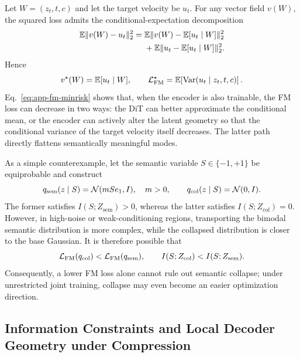 Let $W=(z_t,t,c)$ and let the target velocity be $u_t$. For any vector field $v(W)$, the squared loss admits the conditional-expectation decomposition
\begin{equation}
\begin{aligned}
    \mathbb{E}\|v(W)-u_t\|_2^2
    ={}&
    \mathbb{E}\|v(W)-\mathbb{E}[u_t\mid W]\|_2^2\\
    &+
    \mathbb{E}\|u_t-\mathbb{E}[u_t\mid W]\|_2^2.
\end{aligned}
\label{eq:app-fm-biasvariance}
\end{equation}
Hence
\begin{equation}
    v^\star(W)=\mathbb{E}[u_t\mid W],
    \qquad
    \mathcal{L}_{\mathrm{FM}}^\star
    =
    \mathbb{E}\!\left[\operatorname{Var}(u_t\mid z_t,t,c)\right].
    \label{eq:app-fm-minrisk}
\end{equation}
Eq.~\eqref{eq:app-fm-minrisk} shows that, when the encoder is also trainable, the FM loss can decrease in two ways: the DiT can better approximate the conditional mean, or the encoder can actively alter the latent geometry so that the conditional variance of the target velocity itself decreases. The latter path directly flattens semantically meaningful modes.

As a simple counterexample, let the semantic variable $S\in\{-1,+1\}$ be equiprobable and construct
\begin{equation}
    q_{\mathrm{sem}}(z\mid S)=\mathcal{N}(mSe_1,I),\quad m>0,
    \qquad
    q_{\mathrm{col}}(z\mid S)=\mathcal{N}(0,I).
    \label{eq:app-collapse-example}
\end{equation}
The former satisfies $I(S;Z_{\mathrm{sem}})>0$, whereas the latter satisfies $I(S;Z_{\mathrm{col}})=0$. However, in high-noise or weak-conditioning regions, transporting the bimodal semantic distribution is more complex, while the collapsed distribution is closer to the base Gaussian. It is therefore possible that
\begin{equation}
    \mathcal{L}_{\mathrm{FM}}(q_{\mathrm{col}})
    <
    \mathcal{L}_{\mathrm{FM}}(q_{\mathrm{sem}}),
    \qquad
    I(S;Z_{\mathrm{col}})
    <
    I(S;Z_{\mathrm{sem}}).
    \label{eq:app-collapse-shortcut}
\end{equation}
Consequently, a lower FM loss alone cannot rule out semantic collapse; under unrestricted joint training, collapse may even become an easier optimization direction.

\subsection{Information Constraints and Local Decoder Geometry under Compression}


